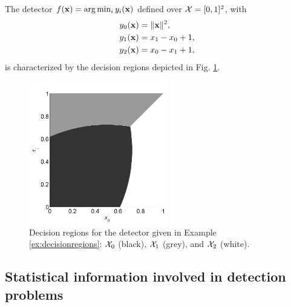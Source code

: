 \begin{example}
\label{ex:decisionregions}
The detector $f({\bf x}) = \arg\min_i y_i({\bf x})$ defined over ${\cal X} = [0,1]^2$, with
\begin{align}
y_0({\bf x}) & = \|{\bf x}\|^2, \nonumber \\
y_1({\bf x}) & = x_1 - x_0 +1, \nonumber \\
y_2({\bf x}) & = x_0 - x_1 + 1, \nonumber 
\end{align}
is characterized by the decision regions depicted in Fig. \ref{fig:decisionregions}.

    \begin{figure}
        \begin{center}
            \includegraphics[width=6cm]{Figures//DecRegEx.pdf}
        \end{center}
        \caption{Decision regions for the detector given in Example \ref{ex:decisionregions}: ${\cal X}_0$ (black), ${\cal X}_1$ (grey), and ${\cal X}_2$ (white).\label{fig:decisionregions}}
    \end{figure}
    
\end{example}

\subsection{Statistical information involved in detection problems}
\label{subsec:statistical_info}

